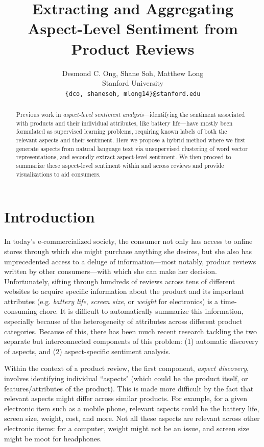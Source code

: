 \documentclass{article} %
\title{  Extracting and Aggregating Aspect-Level Sentiment from Product Reviews  }
\author{
Desmond C. Ong, Shane Soh, Matthew Long \\
Stanford University \\
\texttt{\{dco, shanesoh, mlong14\}@stanford.edu}
}
\begin{document}
\maketitle

\begin{abstract}
Previous work in \textit{aspect-level sentiment analysis}---identifying the sentiment associated with products and their individual attributes, like battery life---have mostly been formulated as supervised learning problems, requiring known labels of both the relevant aspects and their sentiment. Here we propose a hybrid method where we first generate aspects from natural language text via unsupervised clustering of word vector representations, and secondly extract aspect-level sentiment. We then proceed to summarize these aspect-level sentiment within and across reviews and provide visualizations to aid consumers.
\end{abstract}

\section{Introduction}

In today's e-commercialized society, the consumer not only has access to online stores through which she might purchase anything she desires, but she also has unprecedented access to a deluge of information---most notably, product reviews written by other consumers---with which she can make her decision. Unfortunately, sifting through hundreds of reviews across tens of different websites to acquire specific information about the product and its important attributes (e.g. \textit{battery life}, \textit{screen size}, or \textit{weight} for electronics) is a time-consuming chore. It is difficult to automatically summarize this information, especially because of the heterogeneity of attributes across different product categories. Because of this, there has been much recent research tackling the two separate but interconnected components of this problem: (1) automatic discovery of aspects, and (2) aspect-specific sentiment analysis.

Within the context of a product review, the first component, \textit{aspect discovery}, involves identifying individual ``aspects" (which could be the product itself, or features/attributes of the product). This is made more difficult by the fact that relevant aspects might differ across similar products. For example, for a given electronic item such as a mobile phone, relevant aspects could be the battery life, screen size, weight, cost, and more. Not all these aspects are relevant across other electronic items: for a computer, weight might not be an issue, and screen size might be moot for headphones. 
\end{document}
